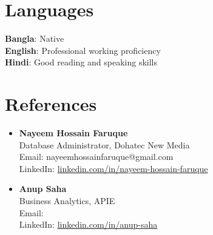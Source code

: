 \documentclass[a4paper, 11pt]{article}
\begin{document}
\section{\textbf{Languages}}
  \begin{itemize}[leftmargin=0in, label={}]
    \small{\item{
      \textbf{Bangla}{: Native} \\
      \textbf{English}{: Professional working proficiency} \\
      \textbf{Hindi}{: Good reading and speaking skills}
    }}
  \end{itemize}

\section{\textbf{References}}
    \begin{itemize}[leftmargin=0in, label={}]
    \item \small{
        \textbf{Nayeem Hossain Faruque} \\
        Database Administrator, Dohatec New Media \\
        Email:  nayeemhossainfaruque@gmail.com \\
        LinkedIn:  \href{https://www.linkedin.com/in/nayeem-hossain-faruque-4a3865294/}{linkedin.com/in/nayeem-hossain-faruque}\\
    }
    \vspace{5pt}
    \item \small{
        \textbf{Anup Saha} \\
        Business Analytics, APIE \\
        Email:  \\
        LinkedIn: \href{https://www.linkedin.com/in/anup-saha-31589816a/}{linkedin.com/in/anup-saha} \\
    }
    \end{itemize}
\end{document}
